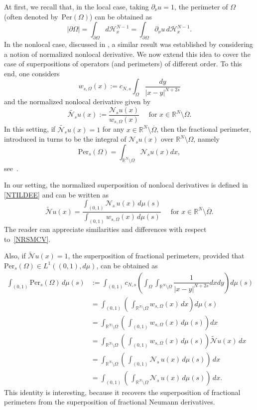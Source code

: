 \documentclass[12pt,a4paper,intlimits,sumlimits]{amsart}
\def \R {\mathbb{R}}
\def \Ns {\mathscr{N}_{s}}
\theoremstyle{definition}
\theoremstyle{plain}
\numberwithin{equation}{section}
\begin{document}
At first, we recall that, in the local case,  taking $\partial_\nu u =1$, the perimeter of $\Omega$
(often denoted by~$\mbox{Per}(\Omega)$) can be obtained as
\[
|\partial\Omega|=\int_{\partial\Omega} d\mathscr H^{N-1}_x = \int_{\partial\Omega} \partial_\nu u \, d\mathscr H^{N-1}_x.
\]
In the nonlocal case, discussed in \cite[Remark 3.4]{MR3651008}, a similar result was established
by considering a notion of normalized nonlocal derivative. We now extend this idea to cover the case of superpositions of operators (and perimeters) of different order.
To this end, one considers
\[w_{s, \Omega}(x):= c_{N, s} \int_\Omega \frac{dy}{|x-y|^{N+2s}}\]
and the normalized nonlocal derivative given by
\begin{equation}\label{NRSMCV}
\widetilde{\Ns}u(x):= \dfrac{\mathscr N_s u(x)}{w_{s, \Omega}(x)}\quad\mbox{ for } x\in\R^N\setminus\overline\Omega.
\end{equation}
In this setting, if $\widetilde{\Ns}u(x)=1$ for any $x\in\R^N\setminus\overline\Omega$, then the fractional perimeter, introduced in \cite{MR2675483} turns to be the integral of $\Ns u(x)$ over $\R^N\setminus\Omega$, namely
\begin{equation}\label{PERFRAC}
\mbox{Per}_s(\Omega) = \int_{\R^N\setminus\Omega} \Ns u(x) dx,
\end{equation}see~\cite[Remark 3.4]{MR3651008}.

In our setting, the normalized superposition of nonlocal derivatives is defined in \eqref{NTILDEE} and can be written as
\[
\widetilde{\mathscr N} u(x) = \dfrac{\displaystyle\int_{(0, 1)} \mathscr N_s \, u(x)\, d\mu(s)}{\displaystyle\int_{(0, 1)}w_{s, \Omega}(x)\, d\mu(s)}\quad\mbox{ for } x\in\R^N\setminus\overline\Omega.
\]
The reader can appreciate similarities and differences with respect to~\eqref{NRSMCV}.

Also, if $\widetilde{\mathscr N} u(x)=1$, the superposition of fractional perimeters, provided that $\mbox{Per}_s(\Omega)\in L^1((0, 1),  d\mu)$, can be obtained as
\begin{equation}\label{PERSUP}
\begin{split}
\int_{(0, 1)} \mbox{Per}_s(\Omega) \, d\mu(s)&:= \int_{(0, 1)} c_{N, s} \left(\int_{\Omega}\int_{\R^N\setminus\Omega} \dfrac{1}{|x-y|^{N+2s}} dx dy\right) d\mu(s)\\
&=\int_{(0, 1)} \left(\,\int_{\R^N\setminus\Omega} w_{s, \Omega}(x) \,dx\right) d\mu(s)\\
&=\int_{\R^N\setminus\Omega} \left(\,\int_{(0, 1)} w_{s, \Omega}(x) \, d\mu(s)\right) dx\\
&= \int_{\R^N\setminus\Omega} \left(\,\int_{(0, 1)} w_{s, \Omega}(x) \, d\mu(s)\right) \widetilde{\mathscr N}u(x)\, dx\\
&= \int_{\R^N\setminus\Omega} \left(\,\int_{(0, 1)} \mathscr N_s \, u(x) \, d\mu(s)\right)\, dx\\
&= \int_{(0, 1)} \left(\,\int_{\R^N\setminus\Omega} \mathscr N_s \, u(x) \, d\mu(s)\right)\, dx.
\end{split}
\end{equation}
This identity is interesting, because it recovers the superposition of fractional perimeters
from the superposition of fractional Neumann derivatives.
\end{document}
